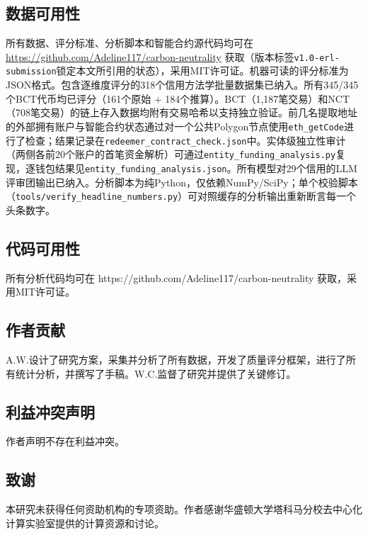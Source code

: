 \documentclass[12pt,a4paper]{article}
\begin{document}
\subsection*{数据可用性}

所有数据、评分标准、分析脚本和智能合约源代码均可在 \url{https://github.com/Adeline117/carbon-neutrality} 获取（版本标签\texttt{v1.0-erl-submission}锁定本文所引用的状态），采用MIT许可证。机器可读的评分标准为JSON格式。包含逐维度评分的318个信用方法学批量数据集已纳入。所有345/345个BCT代币均已评分（161个原始 + 184个推算）。BCT（1,187笔交易）和NCT（708笔交易）的链上存入数据均附有交易哈希以支持独立验证。前几名提取地址的外部拥有账户与智能合约状态通过对一个公共Polygon节点使用\texttt{eth\_getCode}进行了检查；结果记录在\texttt{redeemer\_contract\_check.json}中。实体级独立性审计（两侧各前20个账户的首笔资金解析）可通过\texttt{entity\_funding\_analysis.py}复现，逐钱包结果见\texttt{entity\_funding\_analysis.json}。所有模型对29个信用的LLM评审团输出已纳入。分析脚本为纯Python，仅依赖NumPy/SciPy；单个校验脚本（\texttt{tools/verify\_headline\_numbers.py}）可对照缓存的分析输出重新断言每一个头条数字。


\subsection*{代码可用性}

所有分析代码均可在 https://github.com/Adeline117/carbon-neutrality 获取，采用MIT许可证。

\subsection*{作者贡献}

A.W.设计了研究方案，采集并分析了所有数据，开发了质量评分框架，进行了所有统计分析，并撰写了手稿。W.C.监督了研究并提供了关键修订。

\subsection*{利益冲突声明}

作者声明不存在利益冲突。

\subsection*{致谢}

本研究未获得任何资助机构的专项资助。作者感谢华盛顿大学塔科马分校去中心化计算实验室提供的计算资源和讨论。
\end{document}
